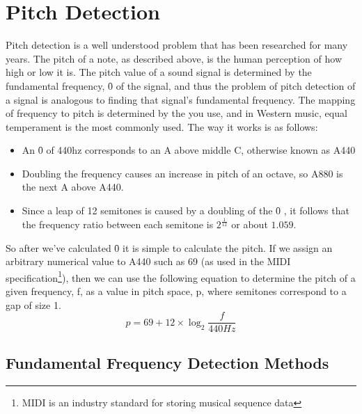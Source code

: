 	\section{Pitch Detection}
	\par
	Pitch detection is a well understood problem that has been researched for many years. The pitch of a note, as described above, is the human perception of how high or low it is. The pitch value of a sound signal is determined by the fundamental frequency, \f0 of the signal, and thus the problem of pitch detection of a signal is analogous to finding that signal's fundamental frequency. 
	The mapping of frequency to pitch is determined by the  you use, and in  Western music, equal temperament is the most commonly used. The way it works is as follows:
	\begin{itemize}
		\item An \f0 of 440hz corresponds to an A above middle C, otherwise known as A440
		\item Doubling the frequency causes an increase in pitch of an octave, so A880 is the  next A above A440.
		\item Since a leap of 12 semitones is caused by a doubling of the \f0 , it follows that the frequency ratio between each semitone is \(2^\frac{1}{12}\) or about \(1.059\).
	\end{itemize}
	So after we've calculated \f0 it is simple to calculate the pitch. If we assign an arbitrary numerical value to A440 such as 69 (as used in the MIDI specification\footnote{MIDI is an industry standard for storing musical sequence data}), then we can use the following equation to determine the pitch of a given frequency, f, as a value in pitch space, p, where semitones correspond to a gap of size 1.
	\[p=69+12\times \log_2 \frac{f}{440Hz}\]
	\par
	
	
	
	
	

	
	\subsection{Fundamental Frequency Detection Methods}
	
